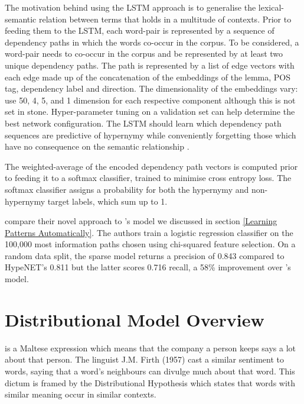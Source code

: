 The motivation behind using the \ac{LSTM} approach is to generalise the lexical-semantic relation between terms that holds in a multitude of contexts.  Prior to feeding them to the \ac{LSTM}, each word-pair is represented by a sequence of dependency paths in which the words co-occur in the corpus.  To be considered, a word-pair needs to co-occur in the corpus and be represented by at least two unique dependency paths.  The path is represented by a list of edge vectors with each edge made up of the concatenation of the embeddings of the lemma, \ac{POS} tag, dependency label and direction.  The dimensionality of the embeddings vary: \citeauthor{shwartz2016path} use 50, 4, 5, and 1 dimension for each respective component \citep{shwartz2016path} although this is not set in stone.  Hyper-parameter tuning on a validation set can help determine the best network configuration.  The \ac{LSTM} should learn which dependency path sequences are predictive of hypernymy while conveniently forgetting those which have no consequence on the semantic relationship \citep{shwartz2016path}.

The weighted-average of the encoded dependency path vectors is computed prior to feeding it to a softmax classifier, trained to minimise cross entropy loss.  The softmax classifier assigns a probability for both the hypernymy and non-hypernymy target labels, which sum up to 1.

\citeauthor{shwartz2016path} compare their novel approach to \citeauthor{Snow2004}'s model \citep{Snow2004} we discussed in section \ref{Learning Patterns Automatically}. The authors train a logistic regression classifier on the 100,000 most information paths chosen using chi-squared feature selection.  On a random data split, the sparse model returns a precision of 0.843 compared to HypeNET’s 0.811 but the latter scores 0.716 recall, a 58\% improvement over \citeauthor{Snow2004}'s model.    

\section{Distributional Model Overview}
 is a Maltese expression which means that the company a person keeps says a lot about that person.  The linguist J.M. Firth (1957) cast a similar sentiment to words, saying that a word’s neighbours can divulge much about that word.  This dictum is framed by the Distributional Hypothesis \citep{harris1954distributional} which states that words with similar meaning occur in similar contexts.  

